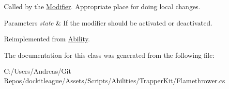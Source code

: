 Called by the \hyperlink{class_modifier}{Modifier}. Appropriate place for doing local changes. 


\begin{DoxyParams}{Parameters}
{\em state} & If the modifier should be activated or deactivated.\\
\hline
\end{DoxyParams}


Reimplemented from \hyperlink{class_ability_a18f5361c45dc334b541892880382c098}{Ability}.



The documentation for this class was generated from the following file\+:\begin{DoxyCompactItemize}
\item 
C\+:/\+Users/\+Andreas/\+Git Repos/dockitleague/\+Assets/\+Scripts/\+Abilities/\+Trapper\+Kit/Flamethrower.\+cs\end{DoxyCompactItemize}
